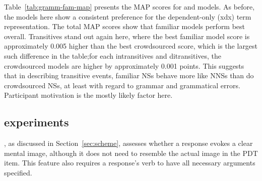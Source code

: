 Table~\ref{tab:gramm-fam-map} presents the  MAP scores for  and  models. As before, the models here show a consistent preference for the dependent-only (xdx) term representation. The total MAP scores show that familiar models perform best overall. Transitives stand out again here, where the best familiar model score is approximately 0.005 higher than the best crowdsourced score, which is the largest such difference in the table;for each intransitives and ditransitives, the crowdsourced models are higher by approximately 0.001 points. This suggests that in describing transitive events, familiar NSs behave more like NNSs than do crowdsourced NSs, at least with regard to grammar and grammatical errors. Participant motivation is the mostly likely factor here.

\subsection{ experiments}
\label{sec:map-interp}

, as discussed in Section~\ref{sec:scheme}, assesses whether a response evokes a clear mental image, although it does not need to resemble the actual image in the PDT item. This feature also requires a response's verb to have all necessary arguments specified.

